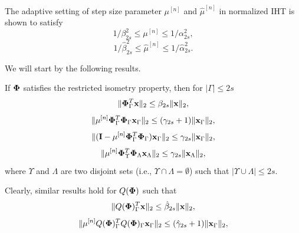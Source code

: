 \documentclass{article}
\begin{document}
\begin{remark}
The adaptive setting of step size parameter $\mu^{[n]}$ and $\hat{\mu}^{[n]}$ in normalized IHT is shown to satisfy
\begin{equation}\label{bounds_mu}
   1/\beta^2_{2s} \leq \mu^{[n]} \leq 1/\alpha^2_{2s},
\end{equation}
\begin{equation}\label{bounds_muhat}
   1/\hat{\beta}^2_{2s} \leq \hat{\mu}^{[n]} \leq 1/\hat{\alpha}^2_{2s}.
\end{equation}
\end{remark}


We will start by the following results.
\begin{lemma}\label{lemmas_on_phi}
{\rm{\cite{blumensath2010niht}}}
If ${\bf {\bf \Phi}}$ satisfies the restricted isometry property, then for $|\Gamma|\leq 2s$
\begin{equation}\label{mu*phi}
    \| {\bf {\bf \Phi}}_{\Gamma}^T{\bf x}\|_2 \leq \beta_{2s}\|{\bf x} \|_2,
\end{equation}
\begin{equation}\label{mu*phi*phi}
    \| \mu^{[n]}{\bf {\bf \Phi}}_{\Gamma}^T{\bf {\bf \Phi}}_{\Gamma}{\bf x}_{\Gamma}\|_2 \leq (\gamma_{2s}+1)\|{\bf x}_{\Gamma} \|_2,
\end{equation}
\begin{equation}\label{1-mu*phi*phi}
    \| ( {\bf I}- \mu^{[n]}{\bf {\bf \Phi}}_{\Gamma}^T{\bf {\bf \Phi}}_{\Gamma}){\bf x}_{\Gamma}\|_2 \leq \gamma_{2s}\|{\bf x}_{\Gamma} \|_2,
\end{equation}
\begin{equation}\label{mu*phi1*phi2}
     \| \mu^{[n]}{\bf {\bf \Phi}}_{\Upsilon}^T{\bf {\bf \Phi}}_{\Lambda}{\bf x}_{\Lambda}\|_2 \leq \gamma_{2s}\|{\bf x}_{\Lambda} \|_2,
\end{equation}
where $\Upsilon$ and $\Lambda$ are two disjoint sets (i.e., $\Upsilon \cap \Lambda = \emptyset$) such that $|\Upsilon \cup \Lambda| \leq 2s$. 
\end{lemma}
Clearly, similar results hold for $Q(\boldsymbol{{\bf \Phi}})$ such that
\begin{equation}\label{q_mu*phi}
     \|Q({\bf {\bf \Phi}})_{\Gamma}^T{\bf x}\|_2 \leq \hat{\beta}_{2s}\|{\bf x} \|_2,
\end{equation}
\begin{equation}\label{q_mu*phi*phi}
    \| \mu^{[n]}Q({\bf {\bf \Phi}})_{\Gamma}^TQ({\bf {\bf \Phi}})_{\Gamma}{\bf x}_{\Gamma}\|_2 \leq (\hat{\gamma}_{2s}+1)\|{\bf x}_{\Gamma} \|_2,
\end{equation}
\end{document}

